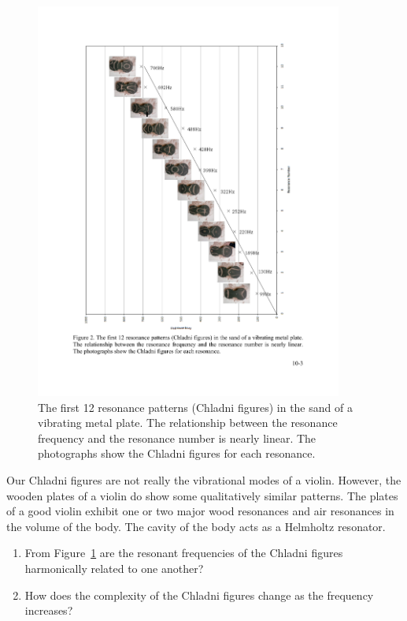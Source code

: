 \documentclass[11pt]{NSF}
\def\ben{\begin{enumerate}}
\def\een{\end{enumerate}}
\begin{document}
\begin{figure}[hbtp]
\begin{center}
\includegraphics[width=0.9\textwidth]{fig10_2}
\caption{The first 12 resonance patterns (Chladni figures) in the sand
of a vibrating metal plate. The relationship between the resonance
frequency and the resonance number is nearly linear. The photographs
show the Chladni figures for each resonance.}
\label{f:2}
\end{center}
\end{figure}
%

Our Chladni figures are not really the vibrational modes of a violin.
However, the wooden plates of a violin do show some qualitatively
similar patterns. 
The plates of a good violin exhibit one or two major wood resonances 
and air resonances in the volume of the body. 
The cavity of the body acts as a Helmholtz resonator.

\ben
\item 
From Figure~\ref{f:2} are the resonant frequencies of the Chladni
figures harmonically related to one another?

\item 
How does the complexity of the Chladni figures change as the frequency increases?
\een
\end{document}
